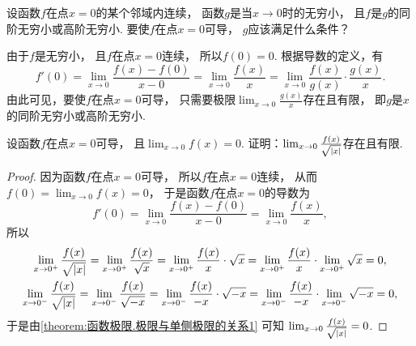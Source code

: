 \begin{example}
设函数\(f\)在点\(x=0\)的某个邻域内连续，
函数\(g\)是当\(x\to0\)时的无穷小，
且\(f\)是\(g\)的同阶无穷小或高阶无穷小.
要使\(f\)在点\(x=0\)可导，
\(g\)应该满足什么条件？
\begin{solution}
由于\(f\)是无穷小，
且\(f\)在点\(x=0\)连续，
所以\(f(0) = 0\).
根据导数的定义，有\begin{equation*}
	f'(0)
	= \lim_{x\to0} \frac{f(x) - f(0)}{x-0} %
	= \lim_{x\to0} \frac{f(x)}{x} %
	= \lim_{x\to0} \frac{f(x)}{g(x)} \cdot \frac{g(x)}{x}. %
\end{equation*}
由此可见，要使\(f\)在点\(x=0\)可导，
只需要极限\(\lim_{x\to0} \frac{g(x)}{x}\)存在且有限，
即\(g\)是\(x\)的同阶无穷小或高阶无穷小.
\end{solution}
\end{example}
\begin{example}
设函数\(f\)在点\(x=0\)可导，
且\(\lim_{x\to0} f(x) = 0\).
证明：\(\lim_{x\to0} \frac{f(x)}{\sqrt{\abs{x}}}\)存在且有限.
\begin{proof}
因为函数\(f\)在点\(x=0\)可导，
所以\(f\)在点\(x=0\)连续，
从而\(f(0) = \lim_{x\to0} f(x) = 0\)，
于是函数\(f\)在点\(x=0\)的导数为\begin{equation*}
	f'(0)
	= \lim_{x\to0} \frac{f(x) - f(0)}{x - 0}
	= \lim_{x\to0} \frac{f(x)}{x},
\end{equation*}
所以\begin{gather*}
	\lim_{x\to0^+} \frac{f(x)}{\sqrt{\abs{x}}}
	= \lim_{x\to0^+} \frac{f(x)}{\sqrt{x}}
	= \lim_{x\to0^+} \frac{f(x)}{x} \cdot \sqrt{x}
	= \lim_{x\to0^+} \frac{f(x)}{x} \cdot \lim_{x\to0^+} \sqrt{x}
	= 0, \\
	\lim_{x\to0^-} \frac{f(x)}{\sqrt{\abs{x}}}
	= \lim_{x\to0^-} \frac{f(x)}{\sqrt{-x}}
	= \lim_{x\to0^-} \frac{f(x)}{-x} \cdot \sqrt{-x}
	= \lim_{x\to0^-} \frac{f(x)}{-x} \cdot \lim_{x\to0^-} \sqrt{-x}
	= 0,
\end{gather*}
于是由\cref{theorem:函数极限.极限与单侧极限的关系1} 可知
\(\lim_{x\to0} \frac{f(x)}{\sqrt{\abs{x}}} = 0\).
\end{proof}
\end{example}
